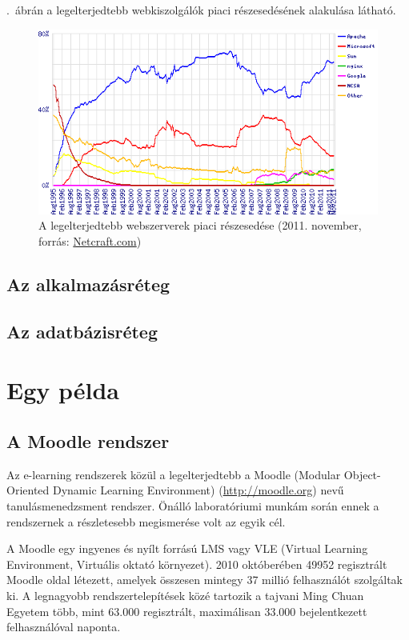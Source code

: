 .~ábrán a legelterjedtebb webkiszolgálók piaci részesedésének alakulása látható.

\begin{figure}[h!]
\centering
\includegraphics[width=1.0\textwidth]{figures/wpid-overallc.png}
\caption{A legelterjedtebb webszerverek piaci részesedése (2011. november, forrás: \href{http://news.netcraft.com/archives/2011/11/07/november-2011-web-server-survey.html}{Netcraft.com}) \label{fig:netcraft_webservers}}
\end{figure} 


\subsection{Az alkalmazásréteg}
\subsection{Az adatbázisréteg}

\section{Egy példa}
\subsection{A Moodle rendszer}
Az e-learning rendszerek közül a legelterjedtebb a Moodle (Modular Object-Oriented Dynamic Learning Environment) (\href{http://moodle.org}{http://moodle.org}) nevű tanulásmenedzsment rendszer. Önálló laboratóriumi munkám során ennek a rendszernek a részletesebb megismerése volt az egyik cél.

A Moodle  egy ingyenes és nyílt forrású LMS vagy VLE (Virtual Learning Environment, Virtuális oktató környezet). 2010 októberében 49952 regisztrált Moodle oldal létezett, amelyek összesen mintegy 37 millió felhasználót szolgáltak ki. A legnagyobb rendszertelepítések közé tartozik a tajvani Ming Chuan Egyetem több, mint 63.000 regisztrált, maximálisan 33.000 bejelentkezett felhasználóval naponta.

